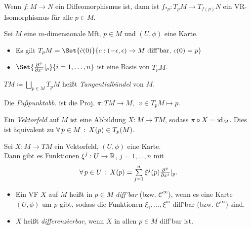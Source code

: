 \documentclass{cheat-sheet}
\newcommand{\coord}[1]{\tfrac{\partial^\phi}{\partial x^{#1}}} %
\newcommand{\Cont}{\mathcal{C}} %
\begin{document}
\begin{kor}
  Wenn $f : M \to N$ ein Diffeomorphismus ist, dann ist $f_{*p} : T_p M \to T_{f(p)} N$ ein VR-Isomorphismus für alle $p \in M$.
\end{kor}

\begin{satz}
  Sei $M$ eine $m$-dimensionale Mft, $p \in M$ und $(U, \phi)$ eine Karte.
  \begin{itemize}
    \item Es gilt $T_p M = \Set{ \dot{c}(0) }{ c : \ointerval{-\epsilon}{\epsilon} \to M \text{ diff'bar}, \, c(0) = p }$
    \item $\Set{\coord{i}|_p}{i=1, \ldots, n}$ ist eine Basis von $T_p M$.
  \end{itemize}
\end{satz}

\begin{defn}
  $TM \coloneqq \!\! \bigsqcup_{p \in M} \!\! T_p M$ heißt \emph{Tangentialbündel} von $M$.
\end{defn}


\begin{defn}
  Die \emph{Fußpunktabb.} ist die Proj.
  $\pi : TM \to M, \enspace v \in T_p M \mapsto p$.
\end{defn}

\begin{defn}
  Ein \emph{Vektorfeld} auf $M$ ist eine Abbildung $X : M \to TM$, sodass $\pi \circ X = \operatorname{id}_M$. Dies ist äquivalent zu $\forall \, {p \in M} \,:\, X(p) \in T_p(M)$.
\end{defn}

\begin{bem}
  Sei $X : M \to TM$ ein Vektorfeld, $(U, \phi)$ eine Karte. \\
  Dann gibt es Funktionen $\xi^j : U \to \mathbb{R}$, $j = 1, \ldots, n$ mit
  \[ \fa{p \in U} X(p) = \sum_{j=1}^n \xi^j(p) \coord{j}|_p. \]
\end{bem}

\begin{defn}
  \begin{itemize}
    \item Ein VF $X$ auf $M$ heißt in $p \in M$ \emph{diff'bar} (bzw. $\Cont^\infty$), wenn es eine Karte $(U, \phi)$ um $p$ gibt, sodass die Funktionen $\xi_1, \ldots, \xi^m$ diff'bar (bzw. $\Cont^\infty$) sind.
    \item $X$ heißt \emph{differenzierbar}, wenn $X$ in allen $p \in M$ diff'bar ist.
  \end{itemize}
\end{defn}
\end{document}
